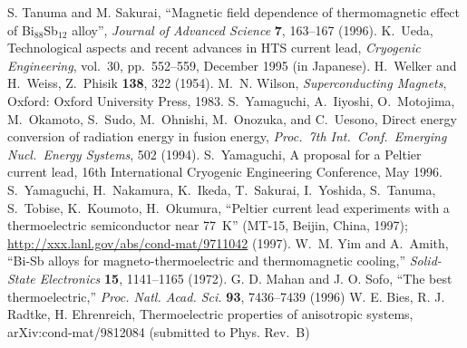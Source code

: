 \documentclass{jspf}            %
\begin{document}
\begin{thebibliography}{99}
  S. Tanuma and M. Sakurai,
  ``Magnetic field dependence of thermomagnetic effect of
  Bi$_{88}$Sb$_{12}$ alloy'',
  \textit{Journal of Advanced Science} \textbf{7}, 163--167 (1996).
  K.~Ueda,
  Technological aspects and recent advances in HTS current lead,
  \textit{Cryogenic Engineering}, vol.~30, pp.~552--559, December 1995
  (in Japanese).
  H.~Welker and H.~Weiss, Z.~Phisik \textbf{138}, 322 (1954).
  M.~N. Wilson, \textit{Superconducting Magnets},
  Oxford: Oxford University Press, 1983.
  S.~Yamaguchi, A.~Iiyoshi, O.~Motojima, M.~Okamoto,
  S.~Sudo, M.~Ohnishi, M.~Onozuka, and C.~Uesono,
  Direct energy conversion of radiation energy in fusion energy,
  \textit{Proc.\ 7th Int.\ Conf.\ Emerging Nucl.\ Energy Systems},
  502 (1994).
  S.~Yamaguchi, A proposal for a Peltier current lead,
  16th International Cryogenic Engineering Conference,
  May 1996.
  S.~Yamaguchi, H.~Nakamura, K.~Ikeda, T.~Sakurai, I.~Yoshida,
  S.~Tanuma, S.~Tobise, K.~Koumoto, H.~Okumura,
  ``Peltier current lead experiments with a thermoelectric semiconductor
  near 77~K''
  (MT-15, Beijin, China, 1997);
  \url{http://xxx.lanl.gov/abs/cond-mat/9711042} (1997).
  W.~M. Yim and A.~Amith,
  ``Bi-Sb alloys for magneto-thermoelectric and thermomagnetic
  cooling,''
  \textit{Solid-State Electronics} \textbf{15}, 1141--1165 (1972).
  G. D. Mahan and J. O. Sofo, ``The best thermoelectric,''
  \textit{Proc. Natl. Acad. Sci.} \textbf{93}, 7436--7439 (1996)
  W. E. Bies, R. J. Radtke, H. Ehrenreich,
  Thermoelectric properties of anisotropic systems,
  arXiv:cond-mat/9812084 (submitted to Phys. Rev.\ B)
\end{thebibliography}
\end{document}
